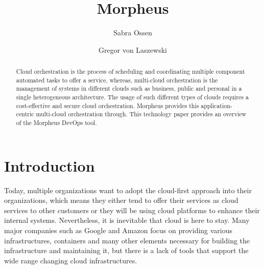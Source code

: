 \title{Morpheus}

\author{Sabra Ossen}

\author{Gregor von Laszewski}

\renewcommand{\shortauthors}{G. v. Laszewski}

\begin{abstract}
Cloud orchestration is the process of scheduling and coordinating multiple 
component automated tasks to offer a service, whereas, multi-cloud 
orchestration is the management of systems in different clouds such as 
business, public and personal in a single heterogeneous architecture. The usage 
of such different types of clouds requires a cost-effective and secure cloud 
orchestration. Morpheus provides this application-centric multi-cloud 
orchestration through. This technology paper provides an overview of the 
Morpheus DevOps tool.
\end{abstract}


\maketitle

\section{Introduction}

Today, multiple organizations want to adopt the cloud-first approach into their 
organizations, which means they either tend to offer their services as cloud 
services to other customers or they will be using cloud platforms to enhance 
their internal systems. Nevertheless, it is inevitable that cloud is here to 
stay. Many major companies such as Google and Amazon focus on providing various 
infrastructures, containers and many other elements necessary for building the 
infrastructure and maintaining it, but there is a lack of tools that support 
the wide range changing cloud infrastructures.

